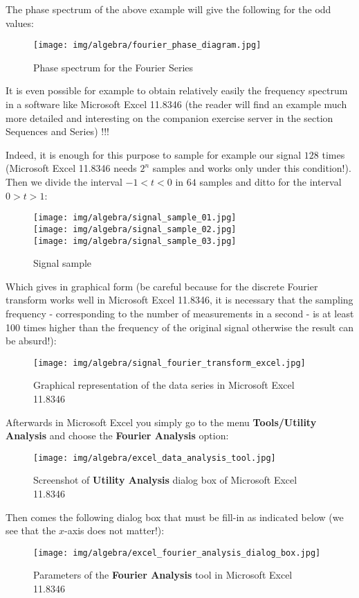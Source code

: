	The phase spectrum of the above example will give the following for the odd values:
	\begin{figure}[H]
		\centering
		\texttt{[image: img/algebra/fourier\_phase\_diagram.jpg]}
		\caption[]{Phase spectrum for the Fourier Series}
	\end{figure}
	It is even possible for example to obtain relatively easily the frequency spectrum in a software like Microsoft Excel 11.8346 (the reader will find an example much more detailed and interesting on the companion exercise server in the section Sequences and Series) !!!
	
	Indeed, it is enough for this purpose to sample for example our signal $128$ times (Microsoft Excel 11.8346 needs $2^n$ samples and works only under this condition!). Then we divide the interval $-1<t<0$ in $64$ samples and ditto for the interval $0>t>1$:
	\begin{figure}[H]
		\centering
		\texttt{[image: img/algebra/signal\_sample\_01.jpg]}\\
		\texttt{[image: img/algebra/signal\_sample\_02.jpg]}\\
		\texttt{[image: img/algebra/signal\_sample\_03.jpg]}
		\caption[]{Signal sample}
	\end{figure}
	Which gives in graphical form (be careful because for the discrete Fourier transform works well in Microsoft Excel 11.8346, it is necessary that the sampling frequency - corresponding to the number of measurements in a second - is at least 100 times higher than the frequency of the original signal otherwise the result can be absurd!):
	\begin{figure}[H]
		\centering
		\texttt{[image: img/algebra/signal\_fourier\_transform\_excel.jpg]}
		\caption[]{Graphical representation of the data series in Microsoft Excel 11.8346}
	\end{figure}
	Afterwards in Microsoft Excel you simply go to the menu \textbf{Tools/Utility Analysis} and choose the \textbf{Fourier Analysis} option:
	\begin{figure}[H]
		\centering
		\texttt{[image: img/algebra/excel\_data\_analysis\_tool.jpg]}
		\caption[]{Screenshot of \textbf{Utility Analysis} dialog box of Microsoft Excel 11.8346}
	\end{figure}
	Then comes the following dialog box that must be fill-in as indicated below (we see that the $x$-axis does not matter!):
	\begin{figure}[H]
		\centering
		\texttt{[image: img/algebra/excel\_fourier\_analysis\_dialog\_box.jpg]}
		\caption[]{Parameters of the \textbf{Fourier Analysis} tool in Microsoft Excel 11.8346}
	\end{figure}
